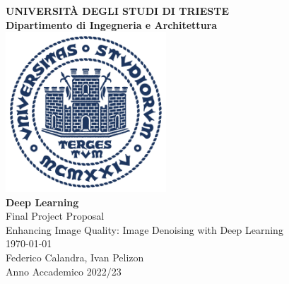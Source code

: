 
\begin{titlepage}
    \begin{center}
        {\LARGE {\bfseries UNIVERSIT\`A DEGLI STUDI DI TRIESTE \\}}
        \vspace{.5cm}
        {\Large {\bfseries Dipartimento di Ingegneria e Architettura \\}}
        \vspace{1cm}
        \includegraphics[width=6cm,height=6cm]{img/units_sigillo_pantone-534}\\[1.5cm]
        \vspace{1cm}
        {\LARGE
            {\bfseries Deep Learning} \\
            Final Project Proposal \\
            \vspace{1cm}
            Enhancing Image Quality: Image Denoising with
            Deep Learning \\
        }
        \vspace{1cm}
        {\large \today \\
        }
        \vfill
        Federico Calandra, Ivan Pelizon \\
        \vspace{.5cm}
        Anno Accademico 2022/23
    \end{center}
\end{titlepage}
